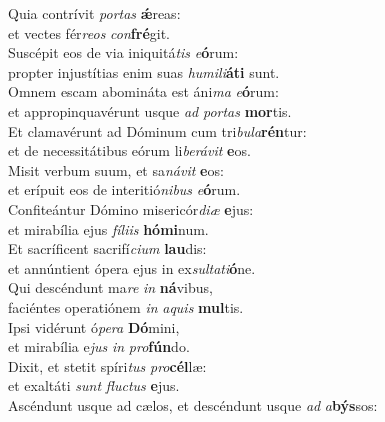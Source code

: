\evenverse Quia contrívit \textit{por}\textit{tas} \textbf{ǽ}reas:~\*\\
\evenverse et vectes fér\textit{re}\textit{os} \textit{con}\textbf{fré}git.\\
\oddverse Suscépit eos de via iniquitá\textit{tis} \textit{e}\textbf{ó}rum:~\*\\
\oddverse propter injustítias enim suas \textit{hu}\textit{mi}\textit{li}\textbf{á}\textbf{ti} sunt.\\
\evenverse Omnem escam abomináta est áni\textit{ma} \textit{e}\textbf{ó}rum:~\*\\
\evenverse et appropinquavérunt usque \textit{ad} \textit{por}\textit{tas} \textbf{mor}tis.\\
\oddverse Et clamavérunt ad Dóminum cum tri\textit{bu}\textit{la}\textbf{rén}tur:~\*\\
\oddverse et de necessitátibus eórum li\textit{be}\textit{rá}\textit{vit} \textbf{e}os.\\
\evenverse Misit verbum suum, et sa\textit{ná}\textit{vit} \textbf{e}os:~\*\\
\evenverse et erípuit eos de interitió\textit{ni}\textit{bus} \textit{e}\textbf{ó}rum.\\
\oddverse Confiteántur Dómino misericór\textit{di}\textit{æ} \textbf{e}jus:~\*\\
\oddverse et mirabília ejus \textit{fí}\textit{li}\textit{is} \textbf{hó}\textbf{mi}num.\\
\evenverse Et sacríficent sacrifí\textit{ci}\textit{um} \textbf{lau}dis:~\*\\
\evenverse et annúntient ópera ejus in ex\textit{sul}\textit{ta}\textit{ti}\textbf{ó}ne.\\
\oddverse Qui descéndunt ma\textit{re} \textit{in} \textbf{ná}vibus,~\*\\
\oddverse faciéntes operatiónem \textit{in} \textit{a}\textit{quis} \textbf{mul}tis.\\
\evenverse Ipsi vidérunt ó\textit{pe}\textit{ra} \textbf{Dó}mini,~\*\\
\evenverse et mirabília e\textit{jus} \textit{in} \textit{pro}\textbf{fún}do.\\
\oddverse Dixit, et stetit spíri\textit{tus} \textit{pro}\textbf{cél}læ:~\*\\
\oddverse et exaltáti \textit{sunt} \textit{flu}\textit{ctus} \textbf{e}jus.\\
\evenverse Ascéndunt usque ad cælos, et descéndunt usque \textit{ad} \textit{a}\textbf{býs}sos:~\*\\
